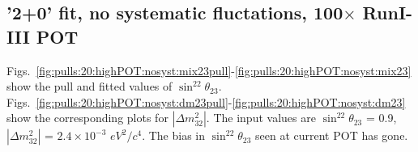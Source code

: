 

\clearpage
\subsection{'2+0' fit, no systematic fluctations, 100$\times$ RunI-III POT}

Figs.\ \ref{fig:pulls:20:highPOT:nosyst:mix23pull}-\ref{fig:pulls:20:highPOT:nosyst:mix23} show the pull and fitted values of
$\sin^22\theta_{23}$.
Figs.\ \ref{fig:pulls:20:highPOT:nosyst:dm23pull}-\ref{fig:pulls:20:highPOT:nosyst:dm23} show the corresponding plots for 
$|\Delta m^2_{32}|$.
The input values are $\sin^22\theta_{23}$ = 0.9, $|\Delta m^2_{32}|$ = $2.4 \times 10^{-3}$ $eV^2/c^4$.
The bias in $\sin^22\theta_{23}$ seen at current POT has gone.

